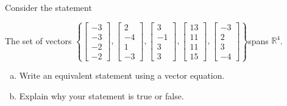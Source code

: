 
\begin{exerciseStatement}


Consider the statement 
\begin{center}\begin{minipage}{0.8\textwidth}
 The set of vectors \( \left\{ \left[\begin{array}{c}
-3 \\
-3 \\
-2 \\
-2
\end{array}\right] , \left[\begin{array}{c}
2 \\
-4 \\
1 \\
-3
\end{array}\right] , \left[\begin{array}{c}
3 \\
-1 \\
3 \\
3
\end{array}\right] , \left[\begin{array}{c}
13 \\
11 \\
11 \\
15
\end{array}\right] , \left[\begin{array}{c}
-3 \\
2 \\
3 \\
-4
\end{array}\right] \right\} \)spans \(\mathbb{R}^4\). 
\end{minipage}\end{center}
    


\begin{enumerate}[(a)]
\item  Write an equivalent statement using a vector equation.
\item  Explain why your statement is true or false.
\end{enumerate}
    
\end{exerciseStatement}
    
